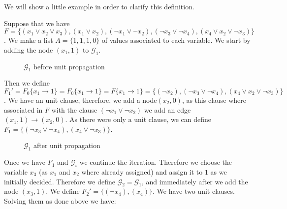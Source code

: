 We will show a little example in order to clarify this definition.
\begin{example} Suppose that we have $F = \{(x_1\vee x_2 \vee x_3), ( x_1 \vee x_2), (\neg x_1 \vee \neg x_2), (\neg x_3 \vee \neg x_4), (x_4 \vee x_2 \vee \neg x_3) \}$. We make a list $A=\{1,1,1,0\}$ of values associated to each variable. We start by adding the node $(x_1,1)$ to $\mathcal{G}_1$. \\


\begin{figure}[H]
  \centering
    \caption{$\mathcal{G}_1$ before unit propagation}
  \end{figure}

  Then we define $F_1' = F_0\{x_1\to 1\} =F_0\{x_1\to 1\} = F\{x_1 \to 1\}= \{(\neg x_2), (\neg x_3 \vee \neg x_4), (x_4 \vee x_2 \vee\neg x_3)\}$. We have an unit clause, therefore, we add a node$(x_2, 0)$, as this clause where associated in $F$ with the clause $(\neg x_1 \vee \neg x_2)$ we add an edge $(x_1,1)\to (x_2,0)$. As there were only a unit clause, we can define $F_1 = \{(\neg x_3 \vee \neg x_4), (x_4 \vee \neg x_3)\}$.\\
  
\begin{figure}[H]
  \centering
  \caption{$\mathcal{G}_1$ after unit propagation}
\end{figure}

Once we have $F_1$ and $\mathcal{G}_i$ we continue the iteration. Therefore we choose the variable $x_3$ (as $x_1$ and $x_2$ where already assigned) and assign it to $1$ as we initially decided. Therefore we define $\mathcal{G}_2 = \mathcal{G}_1 $, and immediately after we add the node $(x_3,1)$. We define $F_2' = \{(\neg x_4), (x_4)\}$. We have two unit clauses. Solving them as done above we have:


\end{example}
